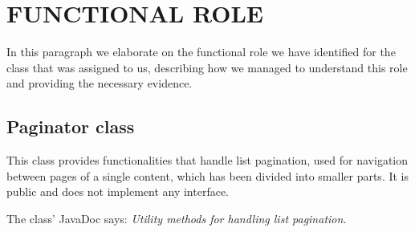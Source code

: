 \section{FUNCTIONAL ROLE}
In this paragraph we elaborate on the functional role we have identified for the class that was assigned to us, describing how we managed to understand this role and providing the necessary evidence.

\subsection{Paginator class}
This class provides functionalities that handle list pagination, used for navigation between pages of a single content, which has been divided into smaller parts. It is public and does not implement any interface. 

The class' JavaDoc says: \textit{Utility methods for handling list pagination.}